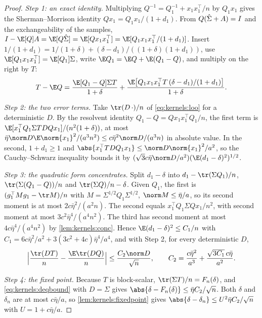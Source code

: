 \begin{refsection}
\begin{proof}
\emph{Step 1: an exact identity.} Multiplying $Q^{-1}=Q_1^{-1}+x_1x_1^\top/n$ by $Q_1x_1$ gives the Sherman--Morrison identity $Qx_1=Q_1x_1/(1+d_1)$. From $Q(\hat\Sigma+A)=I$ and the exchangeability of the samples, $I-\E[Q]A=\E[Q\kernelsSh]=\E[Qx_1x_1^\top]=\E[Q_1x_1x_1^\top/(1+d_1)]$. Insert $1/(1+d_1)=1/(1+\delta)+(\delta-d_1)/((1+\delta)(1+d_1))$, use $\E[Q_1x_1x_1^\top]=\E[Q_1]\Sigma$, write $\E Q_1=\E Q+\E(Q_1-Q)$, and multiply on the right by $T$:
\begin{equation}\label{eq:kernels:loo}
T-\E Q=\frac{\E[Q_1-Q]\Sigma T}{1+\delta}+\frac{\E\bigl[Q_1x_1x_1^\top T\,(\delta-d_1)/(1+d_1)\bigr]}{1+\delta}.
\end{equation}

\emph{Step 2: the two error terms.} Take $\tr(D\,\cdot)/n$ of \eqref{eq:kernels:loo} for a deterministic $D$. By the resolvent identity $Q_1-Q=Qx_1x_1^\top Q_1/n$, the first term is $\E[x_1^\top Q_1\Sigma TDQx_1]/(n^2(1+\delta))$, at most $\bar\eta\norm D\E\norm{x_1}^2/(a^3n^2)\le c\bar\eta^2\norm D/(a^3n)$ in absolute value. In the second, $1+d_1\ge1$ and $\abs{x_1^\top TDQ_1x_1}\le\norm D\norm{x_1}^2/a^2$, so the Cauchy--Schwarz inequality bounds it by $(\sqrt3c\bar\eta\norm D/a^2)(\E(d_1-\delta)^2)^{1/2}$.

\emph{Step 3: the quadratic form concentrates.} Split $d_1-\delta$ into $d_1-\tr(\Sigma Q_1)/n$, $\tr(\Sigma(Q_1-Q))/n$ and $\tr(\Sigma Q)/n-\delta$. Given $Q_1$, the first is $(g_1^\top Mg_1-\tr M)/n$ with $M=\Sigma^{1/2}Q_1\Sigma^{1/2}$, $\norm M\le\bar\eta/a$, so its second moment is at most $2c\bar\eta^2/(a^2n)$. The second equals $x_1^\top Q_1\Sigma Qx_1/n^2$, with second moment at most $3c^2\bar\eta^4/(a^4n^2)$. The third has second moment at most $4c\bar\eta^4/(a^4n^2)$ by \cref{lem:kernels:conc}. Hence $\E(d_1-\delta)^2\le C_1/n$ with $C_1=6c\bar\eta^2/a^2+3(3c^2+4c)\bar\eta^4/a^4$, and with Step 2, for every deterministic $D$,
\begin{equation}\label{eq:kernels:deqbound}
\Bigl|\frac{\tr(DT)}n-\frac{\E\tr(DQ)}n\Bigr|\le\frac{C_2\norm D}{\sqrt n},\qquad C_2=\frac{c\bar\eta^2}{a^3}+\frac{\sqrt{3C_1}\,c\bar\eta}{a^2}.
\end{equation}

\emph{Step 4: the fixed point.} Because $T$ is block-scalar, $\tr(\Sigma T)/n=F_n(\delta)$, and \eqref{eq:kernels:deqbound} with $D=\Sigma$ gives $\abs{\delta-F_n(\delta)}\le\bar\eta C_2/\sqrt n$. Both $\delta$ and $\delta_n$ are at most $c\bar\eta/a$, so \cref{lem:kernels:fixedpoint} gives $\abs{\delta-\delta_n}\le U^2\bar\eta C_2/\sqrt n$ with $U=1+c\bar\eta/a$.


\end{proof}
\end{refsection}
